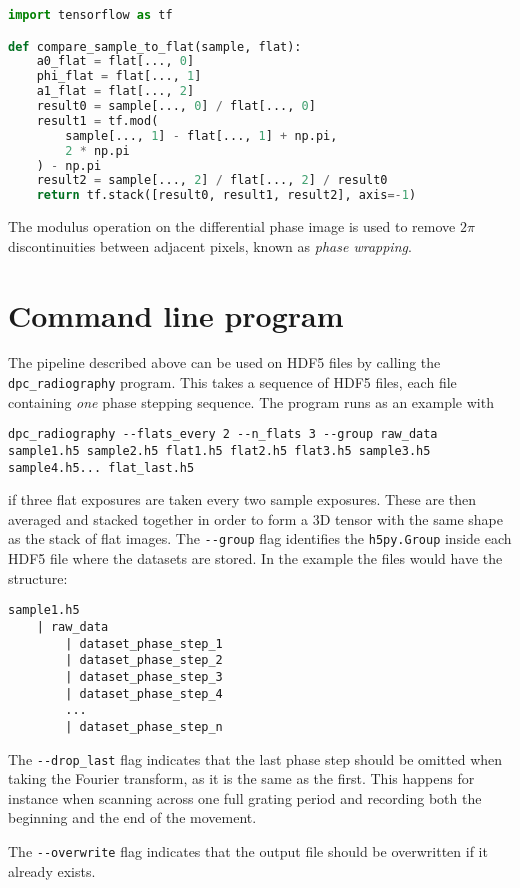 \begin{lstlisting}[language=Python]
import tensorflow as tf

def compare_sample_to_flat(sample, flat):
    a0_flat = flat[..., 0]
    phi_flat = flat[..., 1]
    a1_flat = flat[..., 2]
    result0 = sample[..., 0] / flat[..., 0]
    result1 = tf.mod(
        sample[..., 1] - flat[..., 1] + np.pi,
        2 * np.pi
    ) - np.pi
    result2 = sample[..., 2] / flat[..., 2] / result0
    return tf.stack([result0, result1, result2], axis=-1)
\end{lstlisting}

The modulus operation on the differential phase image is used to remove
$2\pi$ discontinuities between adjacent pixels, known as \emph{phase
wrapping}.

\section{Command line program}
The pipeline described above can be used on HDF5 files by calling the
\texttt{dpc\_radiography} program. This takes a sequence of HDF5 files, each
file containing \emph{one} phase stepping sequence.
The program runs as an example with
\begin{lstlisting}
dpc_radiography --flats_every 2 --n_flats 3 --group raw_data sample1.h5 sample2.h5 flat1.h5 flat2.h5 flat3.h5 sample3.h5 sample4.h5... flat_last.h5
\end{lstlisting}
if three flat exposures are taken every two sample exposures. These are then
averaged and stacked together in order to form a 3D tensor with the same
shape as the stack of flat images.
The \verb|--group| flag identifies the \texttt{h5py.Group} inside 
each HDF5 file where the datasets are stored. In the example the
files would have the structure:
\begin{lstlisting}
sample1.h5
    | raw_data
        | dataset_phase_step_1
        | dataset_phase_step_2
        | dataset_phase_step_3
        | dataset_phase_step_4
        ...
        | dataset_phase_step_n
\end{lstlisting}

The \verb|--drop_last| flag indicates that the last phase step should be
omitted when taking the Fourier transform, as it is the same as the first.
This happens for instance when scanning across one full grating period and
recording both the beginning and the end of the movement.

The \verb|--overwrite| flag indicates that the output file should be
overwritten if it already exists.

